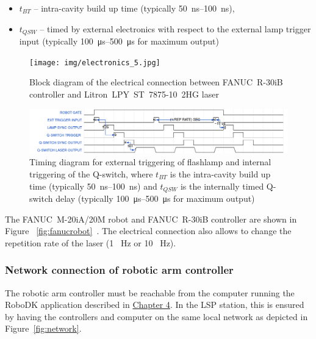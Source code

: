 \begin{itemize}
    \item $t_{BT}$ -- intra-cavity build up time (typically \SIrange{50}{100}{\ns}),
    \item $t_{QSW}$ -- timed by external electronics with respect to the external lamp trigger input (typically \SIrange{100}{500}{\us} for maximum output)

\end{itemize}


\begin{figure}[h]
    \centering
    \texttt{[image: img/electronics\_5.jpg]}
    \caption[Block diagram of the electrical connection]{Block diagram of the electrical connection between FANUC~R-30iB controller and Litron~LPY~ST~7875-10~2HG laser}
    \label{fig:electronics}
\end{figure}

\begin{figure}[h]
    \centering
    \includegraphics[width=0.95\linewidth]{img/wavedrom_bigger.png}
    \caption[Timing diagram for triggering of flashlamp and the Q-switch]{Timing diagram for external triggering of flashlamp and internal triggering of the Q-switch, where $t_{BT}$ is the intra-cavity build up time (typically \SIrange{50}{100}{\ns}) and $t_{QSW}$ is the internally timed Q-switch delay (typically \SIrange{100}{500}{\us} for maximum output)}
    \label{fig:wave}
\end{figure}

\noindent The  FANUC~M-20iA/20M robot and FANUC~R-30iB controller are shown in Figure~ \ref{fig:fanucrobot}~\cite{fanucrobotcontroller}. The electrical connection also allows to change the repetition rate of the laser (1 \SI{}{\hertz} or 10 \SI{}{\hertz}).

\subsubsection*{Network connection of robotic arm controller}


The robotic arm controller must be reachable from the computer running the RoboDK application described in \hyperref[chap:design]{Chapter 4}. In the LSP station, this is ensured by having the controllers and computer on the same local network as depicted in Figure~\ref{fig:network}. 

